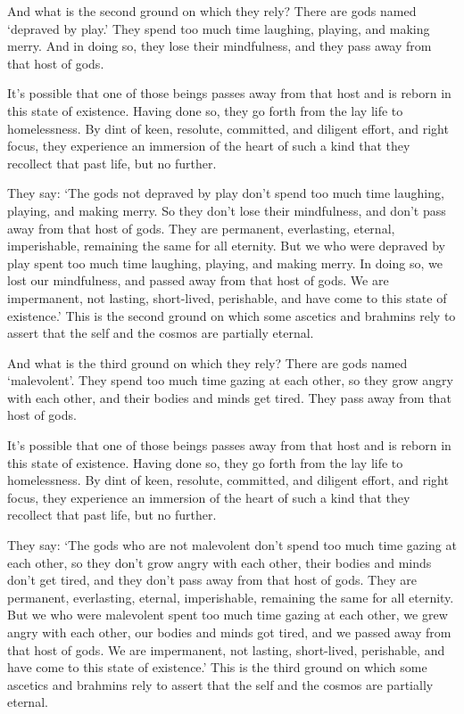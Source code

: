 \documentclass[12pt,openany]{book}%
\begin{document}
And what is the second ground on which they rely? There are gods named ‘depraved by play.’ They spend too much time laughing, playing, and making merry. And in doing so, they lose their mindfulness, and they pass away from that host of gods. 

It’s possible that one of those beings passes away from that host and is reborn in this state of existence. Having done so, they go forth from the lay life to homelessness. By dint of keen, resolute, committed, and diligent effort, and right focus, they experience an immersion of the heart of such a kind that they recollect that past life, but no further. 

They say: ‘The gods not depraved by play don’t spend too much time laughing, playing, and making merry. So they don’t lose their mindfulness, and don’t pass away from that host of gods. They are permanent, everlasting, eternal, imperishable, remaining the same for all eternity. But we who were depraved by play spent too much time laughing, playing, and making merry. In doing so, we lost our mindfulness, and passed away from that host of gods. We are impermanent, not lasting, short-lived, perishable, and have come to this state of existence.’ This is the second ground on which some ascetics and brahmins rely to assert that the self and the cosmos are partially eternal. 

And what is the third ground on which they rely? There are gods named ‘malevolent’. They spend too much time gazing at each other, so they grow angry with each other, and their bodies and minds get tired. They pass away from that host of gods. 

It’s possible that one of those beings passes away from that host and is reborn in this state of existence. Having done so, they go forth from the lay life to homelessness. By dint of keen, resolute, committed, and diligent effort, and right focus, they experience an immersion of the heart of such a kind that they recollect that past life, but no further. 

They say: ‘The gods who are not malevolent don’t spend too much time gazing at each other, so they don’t grow angry with each other, their bodies and minds don’t get tired, and they don’t pass away from that host of gods. They are permanent, everlasting, eternal, imperishable, remaining the same for all eternity. But we who were malevolent spent too much time gazing at each other, we grew angry with each other, our bodies and minds got tired, and we passed away from that host of gods. We are impermanent, not lasting, short-lived, perishable, and have come to this state of existence.’ This is the third ground on which some ascetics and brahmins rely to assert that the self and the cosmos are partially eternal. 
\end{document}
